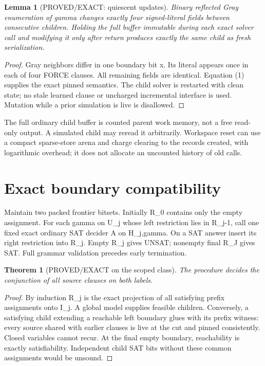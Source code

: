 \documentclass[11pt]{article}
\newtheorem{theorem}{Theorem}
\newtheorem{lemma}{Lemma}
\begin{document}
\begin{lemma}[PROVED/EXACT: quiescent updates]
Binary reflected Gray enumeration of gamma changes exactly four signed-literal fields between consecutive children. Holding the full buffer immutable during each exact solver call and modifying it only after return produces exactly the same child as fresh serialization.
\end{lemma}
\begin{proof}
Gray neighbors differ in one boundary bit x. Its literal appears once in each of four FORCE clauses. All remaining fields are identical. Equation (1) supplies the exact pinned semantics. The child solver is restarted with clean state; no stale learned clause or uncharged incremental interface is used. Mutation while a prior simulation is live is disallowed.
\end{proof}
The full ordinary child buffer is counted parent work memory, not a free read-only output. A simulated child may reread it arbitrarily. Workspace reset can use a compact sparse-store arena and charge clearing to the records created, with logarithmic overhead; it does not allocate an uncounted history of old calls.

\section{Exact boundary compatibility}
Maintain two packed frontier bitsets. Initially R_0 contains only the empty assignment. For each gamma on U_j whose left restriction lies in R_{j-1}, call one fixed exact ordinary SAT decider A on H_{j,gamma}. On a SAT answer insert its right restriction into R_j. Empty R_j gives UNSAT; nonempty final R_J gives SAT. Full grammar validation precedes early termination.

\begin{theorem}[PROVED/EXACT on the scoped class]
The procedure decides the conjunction of all source clauses on both labels.
\end{theorem}
\begin{proof}
By induction R_j is the exact projection of all satisfying prefix assignments onto I_j. A global model supplies feasible children. Conversely, a satisfying child extending a reachable left boundary glues with its prefix witness: every source shared with earlier clauses is live at the cut and pinned consistently. Closed variables cannot recur. At the final empty boundary, reachability is exactly satisfiability. Independent child SAT bits without these common assignments would be unsound.
\end{proof}
\end{document}
